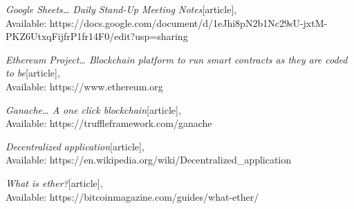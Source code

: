 \begin{thebibliography}{}
\emph{Google Sheets… Daily Stand-Up Meeting Notes}[article],\\
Available: {https://docs.google.com/document/d/1eJhi8pN2b1Nc29sU-jxtM-PKZ6UtxqFijfrP1fr14F0/edit?usp=sharing}

\emph{Ethereum Project… Blockchain platform to run smart contracts as they are coded to be}[article],\\
Available: {https://www.ethereum.org}

\emph{Ganache… A one click blockchain}[article],\\
Available: {https://truffleframework.com/ganache}

\emph{Decentralized application}[article],\\
Available: {https://en.wikipedia.org/wiki/Decentralized\_application}

\emph{What is ether?}[article],\\
Available: {https://bitcoinmagazine.com/guides/what-ether/}

\end{thebibliography}


